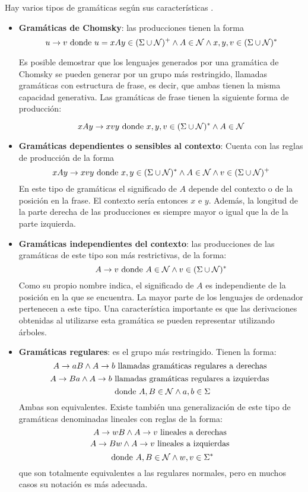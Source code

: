Hay varios tipos de gramáticas según sus características \cite{aho1986compilers}.
\begin{itemize}
\item \textbf{Gramáticas de Chomsky}: las producciones tienen la forma \[u \rightarrow v \textup{ donde } u=xAy \in (\Sigma \cup \mathcal{N})^{+} \wedge A \in \mathcal{N} \wedge x, y, v \in (\Sigma \cup \mathcal{N})^{*}\]

Es posible demostrar que los lenguajes generados por una gramática de Chomsky se pueden generar por un grupo más restringido, llamadas gramáticas con estructura de frase, es decir, que ambas tienen la misma capacidad generativa. Las gramáticas de frase tienen la siguiente forma de producción:

\[xAy \rightarrow xvy \textup{ donde } x,y,v \in (\Sigma \cup \mathcal{N})^{*} \wedge A \in \mathcal{N}\]
\item \textbf{Gramáticas dependientes o sensibles al contexto}: Cuenta con las reglas de producción de la forma  \[xAy \rightarrow xvy \textup{ donde } x, y \in (\Sigma \cup \mathcal{N})^{*} \wedge A \in \mathcal{N} \wedge v \in (\Sigma \cup \mathcal{N})^{+}\]
En este tipo de gramáticas el significado de $A$ depende del contexto o de la posición en la frase. El contexto sería entonces $x$ e $y$. Además, la longitud de la parte derecha de las producciones es siempre mayor o igual que la de la parte izquierda.
\item \textbf{Gramáticas independientes del contexto}: las producciones de las gramáticas de este tipo son más restrictivas, de la forma: 
\[A \rightarrow v \textup{ donde } A \in \mathcal{N} \wedge v \in (\Sigma \cup \mathcal{N})^{*}\]
Como su propio nombre indica, el significado de $A$ es independiente de la posición en la que se encuentra. La mayor parte de los lenguajes de ordenador pertenecen a este tipo. Una característica importante es que las derivaciones obtenidas al utilizarse esta gramática se pueden representar utilizando árboles.

\item \textbf{Gramáticas regulares}: es el grupo más restringido. Tienen la forma: \[A \rightarrow aB \wedge A \rightarrow b \textup{ llamadas gramáticas regulares a derechas } \]
\[A \rightarrow Ba \wedge A \rightarrow b \textup{ llamadas gramáticas regulares a izquierdas } \]
\[ \textup{ donde }A, B \in \mathcal{N} \wedge a,b \in \Sigma  \]
Ambas son equivalentes. Existe también una generalización de este tipo de gramáticas denominadas lineales con reglas de la forma: \[A \rightarrow wB \wedge A \rightarrow v \textup{ lineales a derechas } \]
\[A \rightarrow Bw \wedge A \rightarrow v \textup{ lineales a izquierdas } \]
\[ \textup{ donde }A, B \in \mathcal{N} \wedge w,v \in \Sigma^{*}  \]
que son totalmente equivalentes a las regulares normales, pero en muchos casos su notación es más adecuada.
\end{itemize}

